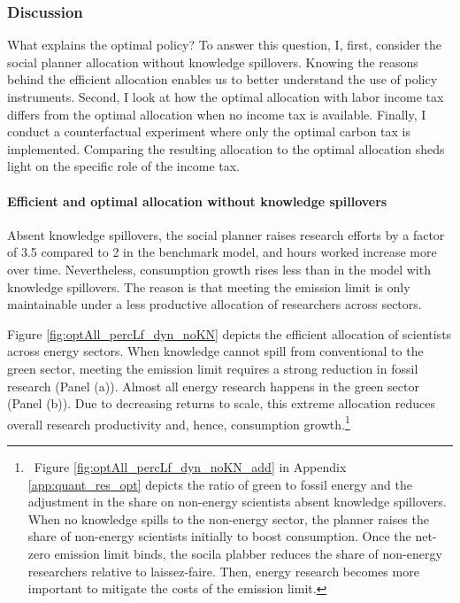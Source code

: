 
\subsubsection{Discussion}\label{subsec:dis}

 What explains the optimal policy?  To answer this question, I, first, consider the social planner allocation without knowledge spillovers. Knowing the reasons behind the efficient allocation enables us to better understand the use of policy instruments. Second, I look at how the optimal allocation with labor income tax differs from the optimal allocation when no income tax is available. 
Finally, I conduct a counterfactual experiment where only the optimal carbon tax is implemented. Comparing the resulting allocation to the optimal allocation sheds light on the specific role of the income tax. 

\paragraph{Efficient and optimal allocation without knowledge spillovers}

Absent knowledge spillovers, the social planner raises research efforts  by a factor of 3.5 compared to 2 in the benchmark model, and hours worked increase more over time. Nevertheless, consumption growth rises less than in the model with knowledge spillovers. The reason is that meeting the emission limit is only maintainable under a less productive allocation of researchers across sectors. 

Figure \ref{fig:optAll_percLf_dyn_noKN} depicts the efficient allocation of scientists across energy sectors. When knowledge cannot spill from conventional to the green sector, meeting the emission limit requires a strong reduction in fossil research (Panel (a)). Almost all energy research happens in the green sector (Panel (b)). Due to decreasing returns to scale, this extreme allocation reduces overall research productivity and, hence, consumption growth.\footnote{\ Figure \ref{fig:optAll_percLf_dyn_noKN_add} in Appendix \ref{app:quant_res_opt} depicts the ratio of green to fossil energy and the adjustment in the share on non-energy scientists absent knowledge spillovers. When no knowledge spills to the non-energy sector, the planner raises the share of non-energy scientists initially to boost consumption. Once the net-zero emission limit binds, the socila plabber reduces the share of non-energy researchers relative to laissez-faire. Then, energy research becomes more important to mitigate the costs of the emission limit.}
 
